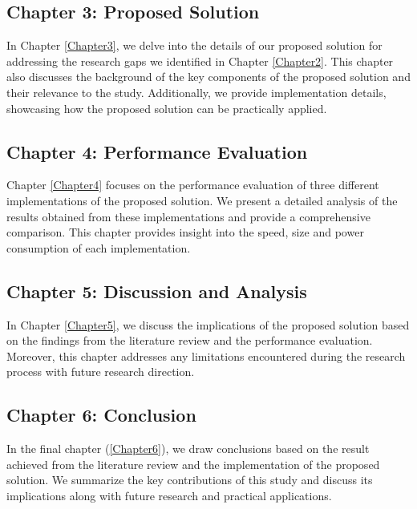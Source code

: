 \subsection{Chapter 3: Proposed Solution}
In Chapter \ref{Chapter3}, we delve into the details of our proposed solution for addressing the research gaps we identified in Chapter \ref{Chapter2}. This chapter also discusses the background of the key components of the proposed solution and their relevance to the study. Additionally, we provide implementation details, showcasing how the proposed solution can be practically applied.

\subsection{Chapter 4: Performance Evaluation}
Chapter \ref{Chapter4} focuses on the performance evaluation of three different implementations of the proposed solution. We present a detailed analysis of the results obtained from these implementations and provide a comprehensive comparison. This chapter provides insight into the speed, size and power consumption of each implementation.

\subsection{Chapter 5: Discussion and Analysis}
In Chapter \ref{Chapter5}, we discuss the implications of the proposed solution based on the findings from the literature review and the performance evaluation. Moreover, this chapter addresses any limitations encountered during the research process with future research direction.


\subsection{Chapter 6: Conclusion}
In the final chapter (\ref{Chapter6}), we draw conclusions based on the result achieved from the literature review and the implementation of the proposed solution. We summarize the key contributions of this study and discuss its implications along with future research and practical applications.



